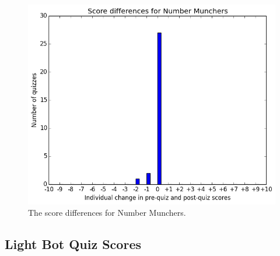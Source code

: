 			\begin{figure}[] 
			\centering 
			\includegraphics[width=\textwidth]{munchers_results.png} 
			\caption{The score differences for Number Munchers.}
			\end{figure}

			\clearpage

		\subsection{Light Bot Quiz Scores}

